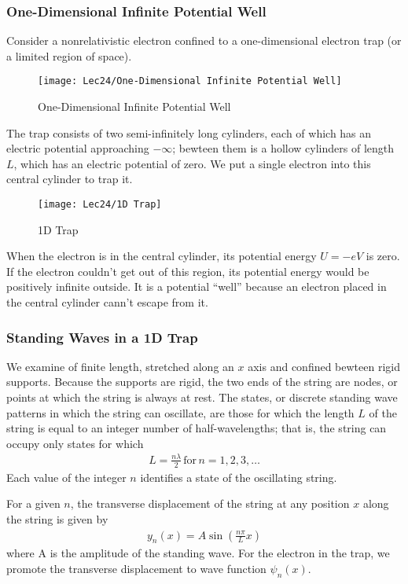 \subsubsection{One-Dimensional Infinite Potential Well}
Consider a nonrelativistic electron confined to a one-dimensional electron trap (or a limited region of space). 

\begin{figure}[H]
    \centering
    \texttt{[image: Lec24/One-Dimensional Infinite Potential Well]}
    \caption{One-Dimensional Infinite Potential Well}
\end{figure}

The trap consists of two semi-infinitely long cylinders, each of which has an electric potential approaching $-\infty$; bewteen them is a hollow cylinders of length $L$, which has an electric potential of zero. We put a single electron into this central cylinder to trap it. 

\begin{figure}[H]
    \centering
    \texttt{[image: Lec24/1D Trap]}
    \caption{1D Trap}
\end{figure}

When the electron is in the central cylinder, its potential energy $U=-eV$ is zero. If the electron couldn't get out of this region, its potential energy would be positively infinite outside. It is a potential ``well'' because an electron placed in the central cylinder cann't escape from it. 

\subsubsection{Standing Waves in a 1D Trap}
We examine  of finite length, stretched along an $x$ axis and confined bewteen rigid supports. Because the supports are rigid, the two ends of the string are nodes, or points at which the string is always at rest. The states, or discrete standing wave patterns in which the string can oscillate, are those for which the length $L$ of the string is equal to an integer number of half-wavelengths; that is, the string can occupy only states for which
\begin{align*}
    L=\frac{n\lambda}{2}\,\text{for}\,n=1,2,3,\dots
\end{align*}
Each value of the integer $n$ identifies a state of the oscillating string. 

For a given $n$, the transverse displacement of the string at any position $x$ along the string is given by 
\begin{align*}
    y_n(x)=A\sin\left( \frac{n\pi}{L} x\right)
\end{align*}
where A is the amplitude of the standing wave. For the electron in the trap, we promote the transverse displacement to wave function $\psi_n(x)$. 

